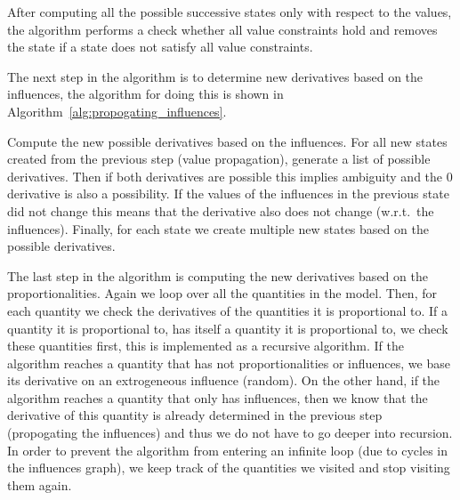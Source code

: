 \documentclass[a4paper]{article}
\begin{document}
After computing all the possible successive states only with respect to the values, the algorithm performs a check whether all value constraints hold and removes the state if a state does not satisfy all value constraints.

The next step in the algorithm is to determine new derivatives based on the influences, the algorithm for doing this is shown in Algorithm~\ref{alg:propogating_influences}.
\begin{algorithm}

\caption{Compute the new possible derivatives based on the influences. For all new states created from the previous step (value propagation), generate a list of possible derivatives. Then if both derivatives are possible this implies ambiguity and the 0 derivative is also a possibility. If the values of the influences in the previous state did not change this means that the derivative also does not change (w.r.t.\ the influences). Finally, for each state we create multiple new states based on the possible derivatives.}
\label{alg:propogating_influences}
\end{algorithm}

The last step in the algorithm is computing the new derivatives based on the proportionalities. Again we loop over all the quantities in the model. Then, for each quantity we check the derivatives of the quantities it is proportional to. If a quantity it is proportional to, has itself a quantity it is proportional to, we check these quantities first, this is implemented as a recursive algorithm. If the algorithm reaches a quantity that has not proportionalities or influences, we base its derivative on an extrogeneous influence (random). On the other hand, if the algorithm reaches a quantity that only has influences, then we know that the derivative of this quantity is already determined in the previous step (propogating the influences) and thus we do not have to go deeper into recursion. In order to prevent the algorithm from entering an infinite loop (due to cycles in the influences graph), we keep track of the quantities we visited and stop visiting them again.
\end{document}
